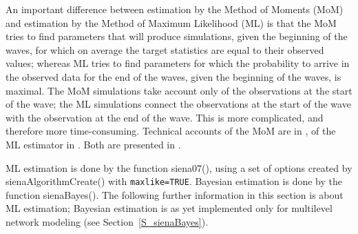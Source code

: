 \documentclass[a4paper,fleqn,11pt]{article}
\newcommand{\+}{\, + \,}
\newcommand{\sfn}[1]{\textsf{#1}}
\begin{document}
An important difference between estimation by the Method of Moments (MoM)
and estimation by the Method of Maximum Likelihood (ML) is that
the MoM tries to find parameters that will produce simulations,
given the beginning of the waves, for which
on average the target statistics are equal to their observed values;
whereas ML tries to find parameters for which the probability to arrive
in the observed data for the end of the waves, given the beginning
of the waves, is maximal. The MoM simulations take account only of the
observations at the start of the wave; the ML simulations connect the
observations at the start of the wave with the observation at the end of the wave.
This is more complicated, and therefore more time-consuming.
Technical accounts of the MoM are in \citet{Snijders01,SnijdersEA07},
of the ML estimator in \citet{SnijdersEA10a}.
Both are presented in \citet{Snijders2017}.
\bigskip

ML estimation is done by the function \sfn{siena07()}, using a set of options
created by \sfn{sienaAlgorithmCreate()} with \texttt{maxlike=TRUE}.
Bayesian estimation is done by the function \sfn{sienaBayes()}.
The following further information in this section is about ML estimation;
Bayesian estimation is as yet implemented only for multilevel network modeling
(see Section~\ref{S_sienaBayes}).
\end{document}
